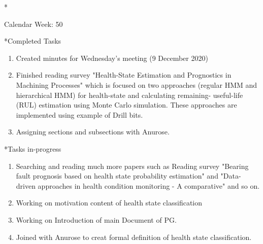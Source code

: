 \documentclass[11pt,a4paper]{article}
\begin{document}
\newpage
\begin{section}*{Calendar Week: 50 \hfill \date{11 December, 2020}}
 \begin{refsection}

       \begin{subsection}*{Completed Tasks}
             \begin{enumerate}
                 \item  Created minutes for Wednesday's meeting (9 December 2020) 
                 \item Finished reading survey "Health-State Estimation and Prognostics in Machining Processes" \cite{DBLP:journals/tase/CamciC10} which is focused on two approaches (regular HMM and hierarchical HMM) for health-state and calculating remaining- useful-life (RUL) estimation using Monte Carlo simulation. These approaches are implemented using example of Drill bits.
                 \item Assigning sections and subsections with Anurose.
             \end{enumerate}
                 
       \end{subsection}

       \begin{subsection}*{Tasks in-progress}
             \begin{enumerate}
                   \item Searching and reading much more papers such as Reading 
                        survey "Bearing fault prognosis based on health state probability estimation" \cite{DBLP:journals/eswa/KimTMC12} and "Data-driven approaches in health condition monitoring - {A} comparative"\cite {DBLP:conf/icca/GeramifardXPZL10} and so on.
                        \item Working on motivation content of health state classification
                        \item Working on Introduction of main Document of PG.
                        \item Joined with Anurose to creat formal definition of health state classification.
             \end{enumerate}
       \end{subsection}

       \printbibliography
 \end{refsection}
\end{section}
\end{document}
